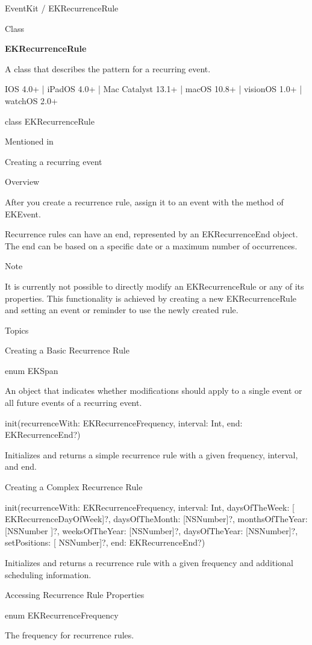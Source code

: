 \documentclass{article}
\title{}
\author{}
\date{}
\begin{document}
EventKit / EKRecurrenceRule

Class

\textbf{EKRecurrenceRule}

A class that describes the pattern for a recurring event.

IOS 4.0+ | iPadOS 4.0+ | Mac Catalyst 13.1+ | macOS 10.8+ | visionOS 1.0+ | watchOS 2.0+

class EKRecurrenceRule

Mentioned in

Creating a recurring event

Overview

After you create a recurrence rule, assign it to an event with the method of EKEvent.

Recurrence rules can have an end, represented by an EKRecurrenceEnd object. The end can be based on a
specific date or a maximum number of occurrences.

Note

It is currently not possible to directly modify an EKRecurrenceRule or any of its properties. This
functionality is achieved by creating a new EKRecurrenceRule and setting an event or reminder to use the
newly created rule.

Topics

Creating a Basic Recurrence Rule

enum EKSpan

An object that indicates whether modifications should apply to a single event or all future events of a
recurring event.

init(recurrenceWith: EKRecurrenceFrequency, interval: Int, end: EKRecurrenceEnd?)

Initializes and returns a simple recurrence rule with a given frequency, interval, and end.

Creating a Complex Recurrence Rule

init(recurrenceWith: EKRecurrenceFrequency, interval: Int, daysOfTheWeek: [
EKRecurrenceDayOfWeek]?, daysOfTheMonth: [NSNumber]?, monthsOfTheYear: [NSNumber
]?, weeksOfTheYear: [NSNumber]?, daysOfTheYear: [NSNumber]?, setPositions: [
NSNumber]?, end: EKRecurrenceEnd?)

Initializes and returns a recurrence rule with a given frequency and additional scheduling information.

Accessing Recurrence Rule Properties

enum EKRecurrenceFrequency

The frequency for recurrence rules.
\end{document}
